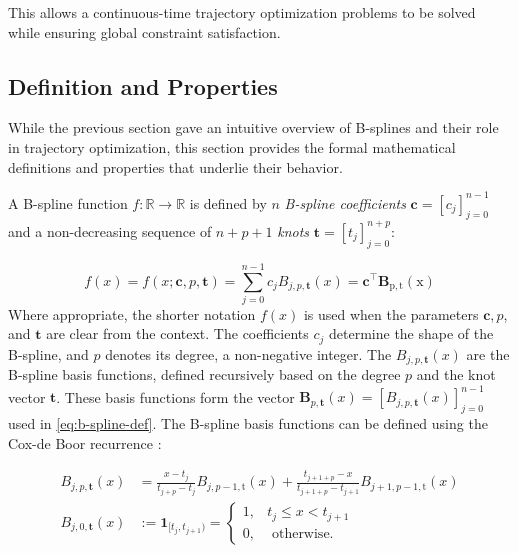 This allows a continuous-time trajectory optimization problems to be solved while ensuring global constraint satisfaction. 





\subsection{Definition and Properties}\label{sec:b-spline-definition}
While the previous section gave an intuitive overview of B-splines and their role in trajectory optimization, this section provides the formal mathematical definitions and properties that underlie their behavior.


A B-spline function $f: \mathbb{R} \rightarrow \mathbb{R}$ is defined by $n$ \emph{B-spline coefficients} $\mathbf{c} = [c_j]_{j=0}^{n-1}$ and a non-decreasing sequence of $n+p+1$ \emph{knots} $\mathbf{t} = [t_j]_{j=0}^{n+p}$:

\begin{equation}\label{eq:b-spline-def}
    f(x) = f(x ; \mathbf{c}, p, \mathbf{t})=\sum_{j=0}^{n-1} c_j B_{j, p, \mathbf{t}}(x)=\mathbf{c}^{\top} \mathbf{B}_{\mathrm{p}, \mathrm{t}}(\mathrm{x})
\end{equation}
Where appropriate, the shorter notation $f(x)$ is used when the parameters $\mathbf{c}, p$, and $\mathbf{t}$ are clear from the context. The coefficients $c_j$ determine the shape of the B-spline, and $p$ denotes its degree, a non-negative integer. The $B_{j, p, \mathbf{t}}(x)$ are the B-spline basis functions, defined recursively based on the degree $p$ and the knot vector $\mathbf{t}$. These basis functions form the vector $\mathbf{B}_{p, \mathbf{t}}(x) = [B_{j, p, \mathbf{t}}(x)]_{j=0}^{n-1}$ used in \cref{eq:b-spline-def}. The B-spline basis functions can be defined using the Cox-de Boor recurrence \citep{deBoor1978practicalguide}:

\begin{subequations}\label{eq:b-spline-recurrence}
    \begin{align}
        B_{j, p, \mathbf{t}}(x) & =\frac{x-t_j}{t_{j+p}-t_j} B_{j, p-1, \mathrm{t}}(x)+\frac{t_{j+1+p}-x}{t_{j+1+p}-t_{j+1}} B_{j+1, p-1, \mathrm{t}}(x) \label{eq:b-spline-recurrence-p} \\
        B_{j, 0, \mathbf{t}}(x) & := 
        \mathbf 1_{[t_j, t_{j+1})} =
        \begin{cases}
            1, & t_j \leq x<t_{j+1} \\
            0, & \text { otherwise. }
        \end{cases} \label{eq:b-spline-recurrence-0}
    \end{align}
\end{subequations}

